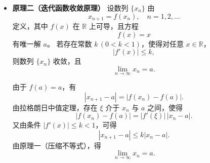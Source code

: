 \documentclass[../book.tex]{subfiles}
\begin{document}
\begin{enumerate}
\begin{itemize}
            \begin{analysisbox}[证]
                由已知条件，
                \[
                    0\le |x_{n+1}-a|\le k|x_n-a|.
                \]
                递推可得
                \[
                    \begin{aligned}
                        0\le |x_{n+1}-a|
                        &\le k|x_n-a| \\
                        &\le k^2|x_{n-1}-a| \\
                        &\ \ \vdots \\
                        &\le k^n|x_1-a|.
                    \end{aligned}
                \]
                又因为 $0<k<1$，
                \[
                    \lim_{n\to\infty}k^n=0.
                \]
                由夹逼准则，
                \[
                    \lim_{n\to\infty}|x_{n+1}-a|=0,
                \]
                从而
                \[
                    \lim_{n\to\infty}x_n=a.
                \]
            \end{analysisbox}

            \item \textbf{原理二（迭代函数收敛原理）}
            设数列 $\{x_n\}$ 由
            \[
                x_{n+1}=f(x_n), \quad n=1,2,\dots
            \]
            定义，其中 $f(x)$ 在 $\mathbb{R}$ 上可导，且方程
            \[
                f(x)=x
            \]
            有唯一解 $a$。
            若存在常数 $k\,(0<k<1)$，使得对任意 $x\in\mathbb{R}$，
            \[
                |f'(x)|\le k,
            \]
            则数列 $\{x_n\}$ 收敛，且
            \[
                \lim_{n\to\infty}x_n=a.
            \]

            \begin{analysisbox}[证]
                由于 $f(a)=a$，有
                \[
                    |x_{n+1}-a|=|f(x_n)-f(a)|.
                \]
                由拉格朗日中值定理，存在 $\xi$ 介于 $x_n$ 与 $a$ 之间，使得
                \[
                    |f(x_n)-f(a)|
                    =|f'(\xi)|\,|x_n-a|.
                \]
                又由条件 $|f'(x)|\le k<1$，可得
                \[
                    |x_{n+1}-a|\le k|x_n-a|.
                \]
                由原理一（压缩不等式），得
                \[
                    \lim_{n\to\infty}x_n=a.
                \]
            \end{analysisbox}
        \end{itemize}
    \end{enumerate}
\end{document}
